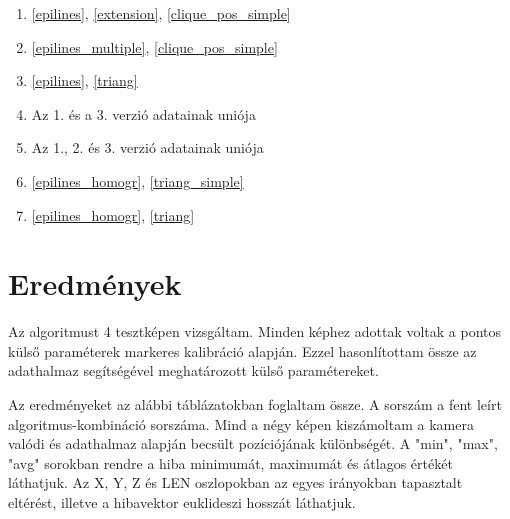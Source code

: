 \documentclass{article}
\begin{document}
	\begin{enumerate}
	\item \ref{epilines}, \ref{extension}, \ref{clique_pos_simple} 	%
	\item \ref{epilines_multiple}, \ref{clique_pos_simple}			%
	\item \ref{epilines}, \ref{triang}								%
	\item Az 1. és a 3. verzió adatainak uniója						%
	\item Az 1., 2. és 3. verzió adatainak uniója 					%
	\item \ref{epilines_homogr}, \ref{triang_simple}				%
	\item \ref{epilines_homogr}, \ref{triang}						%
	\end{enumerate}
	
	\section{Eredmények}	
	Az algoritmust 4 tesztképen vizsgáltam. Minden képhez adottak voltak a pontos külső paraméterek markeres kalibráció alapján. Ezzel hasonlítottam össze az adathalmaz segítségével meghatározott külső paramétereket. 
	
	Az eredményeket az alábbi táblázatokban foglaltam össze. A sorszám a fent leírt algoritmus-kombináció sorszáma. Mind a négy képen kiszámoltam a kamera valódi és adathalmaz alapján becsült pozíciójának különbségét. A "min", "max", "avg" sorokban rendre a hiba minimumát, maximumát és átlagos értékét láthatjuk. Az X, Y, Z és LEN oszlopokban az egyes irányokban tapasztalt eltérést, illetve a hibavektor euklideszi hosszát láthatjuk.
	
\end{document}
